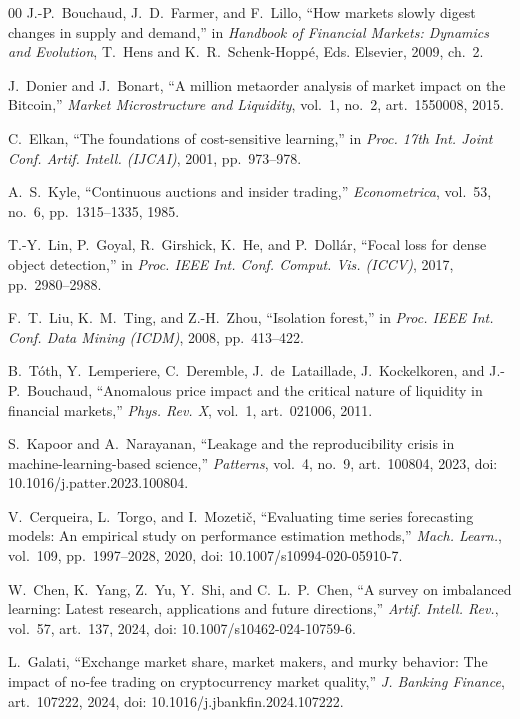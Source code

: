 \documentclass{ieeeaccess}
\begin{document}
\begin{thebibliography}{00}
 J.-P.~Bouchaud, J.~D.~Farmer, and F.~Lillo, ``How markets slowly digest changes in supply and demand,'' in \emph{Handbook of Financial Markets: Dynamics and Evolution}, T.~Hens and K.~R.~Schenk-Hopp\'{e}, Eds.\hspace{0.25em} Elsevier, 2009, ch.~2.

 J.~Donier and J.~Bonart, ``A million metaorder analysis of market impact on the Bitcoin,'' \emph{Market Microstructure and Liquidity}, vol.~1, no.~2, art.~1550008, 2015.

 C.~Elkan, ``The foundations of cost-sensitive learning,'' in \emph{Proc. 17th Int. Joint Conf. Artif. Intell. (IJCAI)}, 2001, pp.~973--978.

 A.~S.~Kyle, ``Continuous auctions and insider trading,'' \emph{Econometrica}, vol.~53, no.~6, pp.~1315--1335, 1985.

 T.-Y.~Lin, P.~Goyal, R.~Girshick, K.~He, and P.~Doll\'{a}r, ``Focal loss for dense object detection,'' in \emph{Proc. IEEE Int. Conf. Comput. Vis. (ICCV)}, 2017, pp.~2980--2988.

 F.~T.~Liu, K.~M.~Ting, and Z.-H.~Zhou, ``Isolation forest,'' in \emph{Proc. IEEE Int. Conf. Data Mining (ICDM)}, 2008, pp.~413--422.

 B.~T\'{o}th, Y.~Lemperiere, C.~Deremble, J.~de~Lataillade, J.~Kockelkoren, and J.-P.~Bouchaud, ``Anomalous price impact and the critical nature of liquidity in financial markets,'' \emph{Phys. Rev. X}, vol.~1, art.~021006, 2011.


 S.~Kapoor and A.~Narayanan, ``Leakage and the reproducibility crisis in machine-learning-based science,'' \emph{Patterns}, vol.~4, no.~9, art.~100804, 2023, doi: 10.1016/j.patter.2023.100804.

 V.~Cerqueira, L.~Torgo, and I.~Mozeti\v{c}, ``Evaluating time series forecasting models: An empirical study on performance estimation methods,'' \emph{Mach. Learn.}, vol.~109, pp.~1997--2028, 2020, doi: 10.1007/s10994-020-05910-7.

 W.~Chen, K.~Yang, Z.~Yu, Y.~Shi, and C.~L.~P.~Chen, ``A survey on imbalanced learning: Latest research, applications and future directions,'' \emph{Artif. Intell. Rev.}, vol.~57, art.~137, 2024, doi: 10.1007/s10462-024-10759-6.

 L.~Galati, ``Exchange market share, market makers, and murky behavior: The impact of no-fee trading on cryptocurrency market quality,'' \emph{J. Banking Finance}, art.~107222, 2024, doi: 10.1016/j.jbankfin.2024.107222.

\end{thebibliography}
\end{document}
